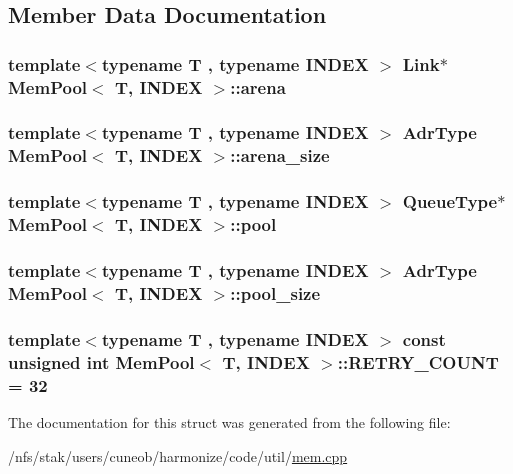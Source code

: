\subsection{Member Data Documentation}
\hypertarget{structMemPool_affe7fe7c80536562358f79d4ff41a92b}{
\subsubsection[{arena}]{\setlength{\rightskip}{0pt plus 5cm}template$<$typename T , typename I\-N\-D\-E\-X $>$ {\bf Link}$\ast$ {\bf Mem\-Pool}$<$ T, I\-N\-D\-E\-X $>$\-::arena}}\label{structMemPool_affe7fe7c80536562358f79d4ff41a92b}
\hypertarget{structMemPool_a3bfcf6da58b80b102be1ec4f4f5b424a}{
\subsubsection[{arena\-\_\-size}]{\setlength{\rightskip}{0pt plus 5cm}template$<$typename T , typename I\-N\-D\-E\-X $>$ {\bf Adr\-Type} {\bf Mem\-Pool}$<$ T, I\-N\-D\-E\-X $>$\-::arena\-\_\-size}}\label{structMemPool_a3bfcf6da58b80b102be1ec4f4f5b424a}
\hypertarget{structMemPool_a50e7e330c2733a1ed0fc48d090c8d7e7}{
\subsubsection[{pool}]{\setlength{\rightskip}{0pt plus 5cm}template$<$typename T , typename I\-N\-D\-E\-X $>$ {\bf Queue\-Type}$\ast$ {\bf Mem\-Pool}$<$ T, I\-N\-D\-E\-X $>$\-::pool}}\label{structMemPool_a50e7e330c2733a1ed0fc48d090c8d7e7}
\hypertarget{structMemPool_a7d96890dc6b226996b58974a633cea75}{
\subsubsection[{pool\-\_\-size}]{\setlength{\rightskip}{0pt plus 5cm}template$<$typename T , typename I\-N\-D\-E\-X $>$ {\bf Adr\-Type} {\bf Mem\-Pool}$<$ T, I\-N\-D\-E\-X $>$\-::pool\-\_\-size}}\label{structMemPool_a7d96890dc6b226996b58974a633cea75}
\hypertarget{structMemPool_a9f0113977dc6ebc1f99aeac36455d49d}{
\subsubsection[{R\-E\-T\-R\-Y\-\_\-\-C\-O\-U\-N\-T}]{\setlength{\rightskip}{0pt plus 5cm}template$<$typename T , typename I\-N\-D\-E\-X $>$ const unsigned int {\bf Mem\-Pool}$<$ T, I\-N\-D\-E\-X $>$\-::R\-E\-T\-R\-Y\-\_\-\-C\-O\-U\-N\-T = 32}}\label{structMemPool_a9f0113977dc6ebc1f99aeac36455d49d}


The documentation for this struct was generated from the following file\-:\begin{DoxyCompactItemize}
\item 
/nfs/stak/users/cuneob/harmonize/code/util/\hyperlink{mem_8cpp}{mem.\-cpp}\end{DoxyCompactItemize}
